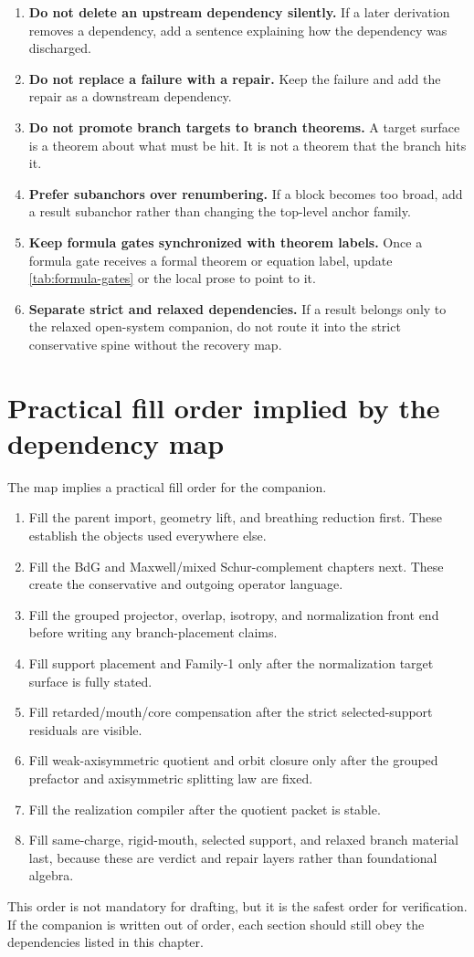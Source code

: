 \begin{enumerate}[leftmargin=2.2em]
  \item \textbf{Do not delete an upstream dependency silently.}  If a later derivation removes a dependency, add a sentence explaining how the dependency was discharged.
  \item \textbf{Do not replace a failure with a repair.}  Keep the failure and add the repair as a downstream dependency.
  \item \textbf{Do not promote branch targets to branch theorems.}  A target surface is a theorem about what must be hit.  It is not a theorem that the branch hits it.
  \item \textbf{Prefer subanchors over renumbering.}  If a block becomes too broad, add a result subanchor rather than changing the top-level anchor family.
  \item \textbf{Keep formula gates synchronized with theorem labels.}  Once a formula gate receives a formal theorem or equation label, update \cref{tab:formula-gates} or the local prose to point to it.
  \item \textbf{Separate strict and relaxed dependencies.}  If a result belongs only to the relaxed open-system companion, do not route it into the strict conservative spine without the recovery map.
\end{enumerate}

\section{Practical fill order implied by the dependency map}
\label{sec:dependency-implied-fill-order}

The map implies a practical fill order for the companion.

\begin{enumerate}[leftmargin=2.2em]
  \item Fill the parent import, geometry lift, and breathing reduction first.  These establish the objects used everywhere else.
  \item Fill the BdG and Maxwell/mixed Schur-complement chapters next.  These create the conservative and outgoing operator language.
  \item Fill the grouped projector, overlap, isotropy, and normalization front end before writing any branch-placement claims.
  \item Fill support placement and Family-1 only after the normalization target surface is fully stated.
  \item Fill retarded/mouth/core compensation after the strict selected-support residuals are visible.
  \item Fill weak-axisymmetric quotient and orbit closure only after the grouped prefactor and axisymmetric splitting law are fixed.
  \item Fill the realization compiler after the quotient packet is stable.
  \item Fill same-charge, rigid-mouth, selected support, and relaxed branch material last, because these are verdict and repair layers rather than foundational algebra.
\end{enumerate}

This order is not mandatory for drafting, but it is the safest order for verification.  If the companion is written out of order, each section should still obey the dependencies listed in this chapter.
